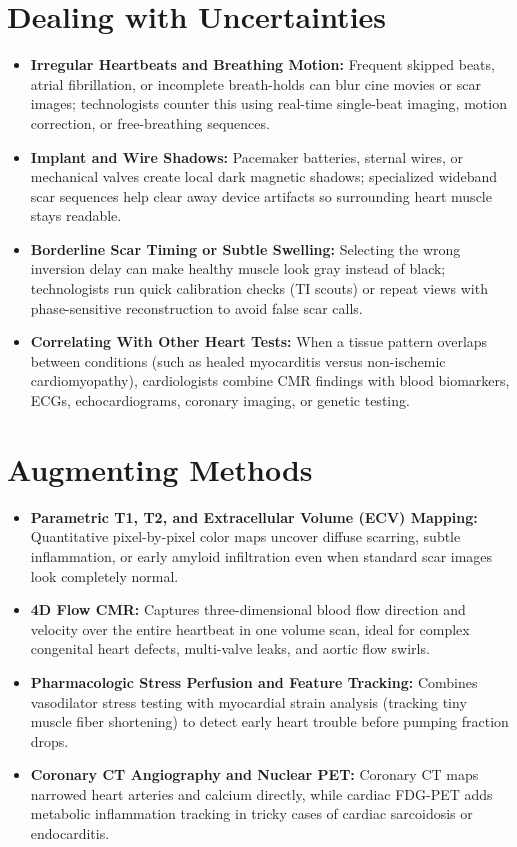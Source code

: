 \section{Dealing with Uncertainties}
\begin{itemize}
\item \textbf{Irregular Heartbeats and Breathing Motion:} Frequent skipped beats, atrial fibrillation, or incomplete breath-holds can blur cine movies or scar images; technologists counter this using real-time single-beat imaging, motion correction, or free-breathing sequences.
\item \textbf{Implant and Wire Shadows:} Pacemaker batteries, sternal wires, or mechanical valves create local dark magnetic shadows; specialized wideband scar sequences help clear away device artifacts so surrounding heart muscle stays readable.
\item \textbf{Borderline Scar Timing or Subtle Swelling:} Selecting the wrong inversion delay can make healthy muscle look gray instead of black; technologists run quick calibration checks (TI scouts) or repeat views with phase-sensitive reconstruction to avoid false scar calls.
\item \textbf{Correlating With Other Heart Tests:} When a tissue pattern overlaps between conditions (such as healed myocarditis versus non-ischemic cardiomyopathy), cardiologists combine CMR findings with blood biomarkers, ECGs, echocardiograms, coronary imaging, or genetic testing.
\end{itemize}

\section{Augmenting Methods}
\begin{itemize}
\item \textbf{Parametric T1, T2, and Extracellular Volume (ECV) Mapping:} Quantitative pixel-by-pixel color maps uncover diffuse scarring, subtle inflammation, or early amyloid infiltration even when standard scar images look completely normal.
\item \textbf{4D Flow CMR:} Captures three-dimensional blood flow direction and velocity over the entire heartbeat in one volume scan, ideal for complex congenital heart defects, multi-valve leaks, and aortic flow swirls.
\item \textbf{Pharmacologic Stress Perfusion and Feature Tracking:} Combines vasodilator stress testing with myocardial strain analysis (tracking tiny muscle fiber shortening) to detect early heart trouble before pumping fraction drops.
\item \textbf{Coronary CT Angiography and Nuclear PET:} Coronary CT maps narrowed heart arteries and calcium directly, while cardiac FDG-PET adds metabolic inflammation tracking in tricky cases of cardiac sarcoidosis or endocarditis.
\end{itemize}

